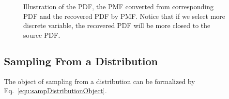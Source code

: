 \documentclass[runningheads,openany]{xhlPaper}
\begin{document}
\begin{figure}
\centering
{}
\caption{Illustration of the PDF, the PMF converted from corresponding PDF and the recovered PDF by PMF. Notice that if we select more discrete variable, the recovered PDF will be more closed to the source PDF.}
\label{fig:sampPDFConverted}
\end{figure}

\subsection{Sampling From a Distribution}
The object of sampling from a distribution can be formalized by Eq.~\ref{equ:sampDistributionObject}.
\end{document}
